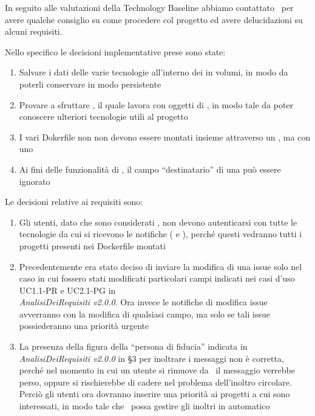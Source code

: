     In seguito alle valutazioni della Technology Baseline abbiamo contattato \DZ\ per avere qualche consiglio su come procedere col progetto ed avere delucidazioni su alcuni requisiti.

    Nello specifico le decisioni implementative prese sono state:
    \begin{enumerate}
        \item Salvare i dati delle varie tecnologie all'interno dei  in volumi, in modo da poterli conservare in modo persistente
        \item Provare a sfruttare , il quale lavora con oggetti di , in modo tale da poter conoscere ulteriori tecnologie utili al progetto
        \item I vari Dokerfile non non devono essere montati insieme attraverso un , ma con uno 
        \item Ai fini delle funzionalità di \progetto, il campo ``destinatario'' di una  può essere ignorato
    \end{enumerate}

    Le decisioni relative ai requisiti sono:
    \begin{enumerate}
        \item Gli utenti, dato che sono considerati , non devono autenticarsi con tutte le tecnologie da cui si ricevono le notifiche ( e ), perché questi vedranno tutti i progetti presenti nei Dockerfile montati
        \item Precedentemente era stato deciso di inviare la modifica di una issue solo nel caso in cui fossero stati modificati particolari campi indicati nei casi d'uso UC1.1-PR e UC2.1-PG in\\ \textit{AnalisiDeiRequisiti v2.0.0}. Ora invece le notifiche di modifica issue avverranno con la modifica di qualsiasi campo, ma solo se tali issue possiederanno una priorità urgente
        \item La presenza della figura della ``persona di fiducia'' indicata in \textit{AnalisiDeiRequisiti v2.0.0} in §3 per inoltrare i messaggi non è corretta, perché nel momento in cui un utente si rimuove da \progetto\ il messaggio verrebbe perso, oppure si rischierebbe di cadere nel problema dell'inoltro circolare. Perciò gli utenti ora dovranno inserire una priorità ai progetti a cui sono interessati, in modo tale che \progetto\ possa gestire gli inoltri in automatico
    \end{enumerate}

